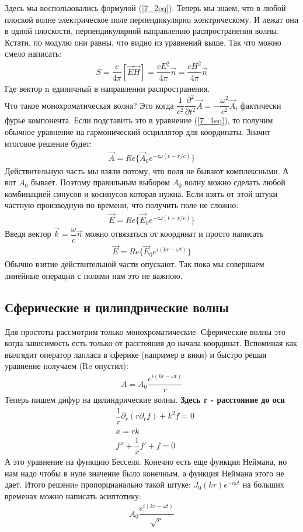 	Здесь мы воспользовались формулой (\ref{7_2eq}). Теперь мы знаем, что в любой плоской волне электрическое поле перпендикулярно электрическому. И лежат они в одной плоскости, перпендикулярной направлению распространения волны. Кстати, по модулю они равны, что видно из уравнений выше. Так что можно смело написать:
	\begin{align*}
	S = \dfrac{c}{4\pi} [\vec{E} \vec{H}] = \dfrac{c E^2}{4\pi}\vec{n} = \dfrac{cH^2}{4\pi}\vec{n}
	\end{align*}
	Где вектор n единичный в направлении распространения. \\
	Что такое монохроматическая волна? Это когда $\dfrac{1}{c^2} \dfrac{\partial^2}{\partial t^2}\vec{A} =- \dfrac{\omega^2}{c^2} \vec{A}$, фактически фурье компонента. Если подставить это в уравнение (\ref{7_1eq}), то получим обычное уравнение на гармонический осциллятор для координаты. Значит итоговое решение будет:
	\begin{align*}
	\vec{A} = 	Re\{ \vec{A}_0 e^{-i \omega (t - x/c)}\}
	\end{align*}
	Действительную часть мы взяли потому, что поля не бывают комплексными. А вот $A_0$ бывает. Поэтому правильным выбором $A_0$ волну можно сделать любой комбинацией синусов и косинусов которая нужна. Если взять от этой штуки частную производную по времени, что получить поле не сложно:
	\begin{align*}
	\vec{E} = 	Re\{ \vec{E}_0 e^{-i \omega (t - x/c)}\}
	\end{align*}
	Введя вектор $\vec{k} = \dfrac{\omega}{c} \vec{n}$ можно отвязаться от координат и просто написать
	\begin{align*}
	\vec{E} = 	Re\{ \vec{E}_0 e^{i (kr - \omega t)}\}
	\end{align*}
	Обычно взятие действительной части опускают. Так пока мы совершаем линейные операции с полями нам это не важною.  \\
	\subsection*{Сферические и цилиндрические волны}
	Для простоты рассмотрим только монохроматические. Сферические волны это когда зависимость есть только от расстояния до начала координат. Вспоминая как вылгядит оператор лапласа в сферике (например в вики) и быстро решая уравнение получаем (Re опустил):
	\begin{align*}
	A = A_0 \dfrac{e^{i (kr - \omega t)}}{r}
	\end{align*}
	Теперь пишем дифур на цилиндрические волны. \textbf{Здесь r - расстояние до оси}
	\begin{align*}
	&\dfrac{1}{r} \partial_r (r \partial_r f) + k^2 f = 0\\
	& x = r k\\
	&f'' + \dfrac{1}{x} f' + f = 0
	\end{align*} 
	А это уравнение на функцию Бесселя. Конечно есть еще функция Неймана, но нам надо чтобы в нуле значение было конечным, а функция Неймана этого не дает. Итого решениe пропорцианально такой штуке: $J_0(k r) e^{-i\omega t}$ на больших временах можно написать асиптотику: 
	\begin{align*}
	A_0 \dfrac{e^{i (kr - \omega t)}}{\sqrt{r}}
	\end{align*}
